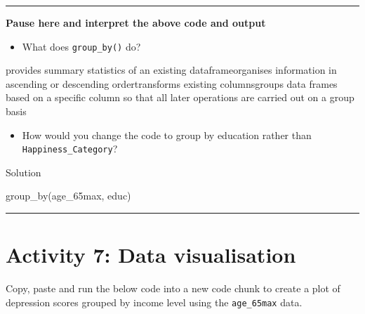 \documentclass[
  oneside]{book}
\newenvironment{Shaded}{\begin{snugshade}}{\end{snugshade}}
\newcommand{\FunctionTok}[1]{\textcolor[rgb]{0.00,0.00,0.00}{#1}}
\newcommand{\NormalTok}[1]{#1}
\providecommand{\tightlist}{%
  \setlength{\itemsep}{0pt}\setlength{\parskip}{0pt}}
\begin{document}
\begin{center}\rule{0.5\linewidth}{0.5pt}\end{center}

\textbf{Pause here and interpret the above code and output}

\begin{itemize}
\tightlist
\item
  What does \texttt{group\_by()} do?
\end{itemize}

provides summary statistics of an existing dataframeorganises information in ascending or descending ordertransforms existing columnsgroups data frames based on a specific column so that all later operations are carried out on a group basis

\begin{itemize}
\tightlist
\item
  How would you change the code to group by education rather than \texttt{Happiness\_Category}?
\end{itemize}

Solution

\begin{Shaded}
\begin{Highlighting}[]
\FunctionTok{group\_by}\NormalTok{(age\_65max, educ)}
\end{Highlighting}
\end{Shaded}

\begin{center}\rule{0.5\linewidth}{0.5pt}\end{center}

\hypertarget{activity-7-data-visualisation}{%
\section{Activity 7: Data visualisation}\label{activity-7-data-visualisation}}

Copy, paste and run the below code into a new code chunk to create a plot of depression scores grouped by income level using the \texttt{age\_65max} data.
\end{document}
